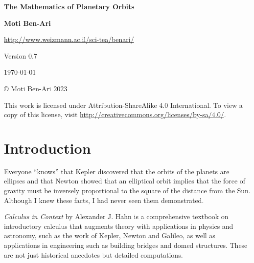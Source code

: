 

\thispagestyle{empty}

\begin{center}
\textbf{\LARGE The Mathematics of Planetary Orbits}

\bigskip
\bigskip
\bigskip

\textbf{\Large Moti Ben-Ari}

\bigskip

\url{http://www.weizmann.ac.il/sci-tea/benari/}

\bigskip
\bigskip
\bigskip

Version $0.7$

\bigskip

\today

\end{center}

\vfill

\begin{center}
\copyright{} Moti Ben-Ari $2023$
\end{center}
 
\begin{small}
This work is licensed under Attribution-ShareAlike 4.0 International. To view a copy of this license, visit \url{http://creativecommons.org/licenses/by-sa/4.0/}.
\end{small}

\newpage

\tableofcontents

\newpage

\section{Introduction}

Everyone ``knows'' that Kepler discovered that the orbits of the planets are ellipses and that Newton showed that an elliptical orbit implies that the force of gravity must be inversely proportional to the square of the distance from the Sun. Although I knew these facts, I had never seen them demonstrated.

\textit{Calculus in Context} \cite{hahn-cic} by Alexander J. Hahn is a comprehensive textbook on introductory calculus that augments theory with  applications in physics and astronomy, such as the work of Kepler, Newton and Galileo, as well as applications in engineering such as building bridges and domed structures. These are not just historical anecdotes but detailed computations.

